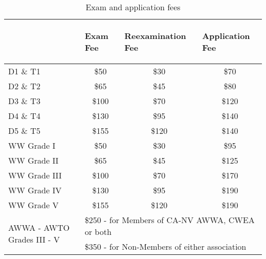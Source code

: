 \begin{table}[H]
\captionsetup{justification=centering}
\scriptsize
\begin{center}
\begin{tabular}{|l|p{2cm}|p{2cm}|p{2cm}|}
\hline
 & \begin{center}  {Exam Fee} \end{center} & \begin{center}{Reexamination Fee}  \end{center} & \begin{center}{Application Fee}  \end{center}\\
\hline
D1 \& T1 & \multicolumn{1}{|c|}{\$50} & \multicolumn{1}{|c|}{ \$30} & \multicolumn{1}{|c|}{\$70}\\
\hline
D2 \& T2  & \multicolumn{1}{|c|}{\$65} & \multicolumn{1}{|c|}{\$45} & \multicolumn{1}{|c|}{\$80}\\
\hline
D3 \& T3 & \multicolumn{1}{|c|}{\$100} & \multicolumn{1}{|c|}{\$70} & \multicolumn{1}{|c|}{\$120}\\
\hline
D4 \& T4 & \multicolumn{1}{|c|}{\$130}& \multicolumn{1}{|c|}{\$95}& \multicolumn{1}{|c|}{\$140}\\
\hline
D5 \& T5 & \multicolumn{1}{|c|}{\$155}& \multicolumn{1}{|c|}{\$120}& \multicolumn{1}{|c|}{\$140}\\
\hline
WW Grade I & \multicolumn{1}{|c|}{\$50} & \multicolumn{1}{|c|}{ \$30} & \multicolumn{1}{|c|}{\$95}\\
\hline
WW Grade II  & \multicolumn{1}{|c|}{\$65} & \multicolumn{1}{|c|}{\$45} & \multicolumn{1}{|c|}{\$125}\\
\hline
WW Grade III  & \multicolumn{1}{|c|}{\$100} & \multicolumn{1}{|c|}{\$70} & \multicolumn{1}{|c|}{\$170}\\
\hline
WW Grade IV & \multicolumn{1}{|c|}{\$130}& \multicolumn{1}{|c|}{\$95}& \multicolumn{1}{|c|}{\$190}\\
\hline
WW Grade V  & \multicolumn{1}{|c|}{\$155}& \multicolumn{1}{|c|}{\$120}& \multicolumn{1}{|c|}{\$190}\\
\hline
\multirow{2}{*}{AWWA - AWTO Grades III - V} & \multicolumn{3}{|l|}{\$250 - for Members of CA-NV AWWA, CWEA or both} \\
&\multicolumn{3}{|l|}{\$350 - for Non-Members of either association}\\
\hline
\end{tabular}
\caption{Exam and application fees}
\end{center}
\end{table}
